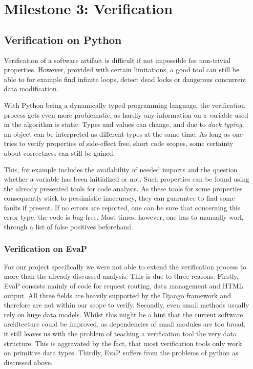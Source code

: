 \section{Milestone 3: Verification}

\subsection{Verification on Python}

Verification of a software artifact is difficult if not impossible for non-trivial properties.
However, provided with certain limitations, a good tool can still be able to for example find infinite loops, detect dead locks or dangerous concurrent data modification.

With Python being a dynamically typed programming language, the verification process gets even more problematic, as hardly any information on a variable used in the algorithm is static:
Types and values can change, and due to \textit{duck typing}, an object can be interpreted as different types at the same time.
As long as one tries to verify properties of side-effect free, short code scopes, some certainty about correctness can still be gained.

This, for example includes the availability of needed imports and the question whether a variable has been initialized or not.
Such properties can be found using the already presented tools for code analysis.
As these tools for some properties consequently stick to pessimistic inaccuracy, they can guarantee to find some faults if present.
If no errors are reported, one can be sure that concerning this error type, the code is bug-free.
Most times, however, one has to manually work through a list of false positives beforehand.

\subsubsection{Verification on EvaP}

For our project specifically we were not able to extend the verification process to more than the already discussed analysis.
This is due to three reasons:
Firstly, EvaP consists mainly of code for request routing, data management and HTML output.
All three fields are heavily supported by the Django framework and therefore are not within our scope to verify.
Secondly, even small methods usually rely on huge data models.
Whilst this might be a hint that the current software architecture could be improved, as dependencies of small modules are too broad, it still leaves us with the problem of teaching a verification tool the very data structure.
This is aggravated by the fact, that most verification tools only work on primitive data types.
Thirdly, EvaP suffers from the problems of python as discussed above.

